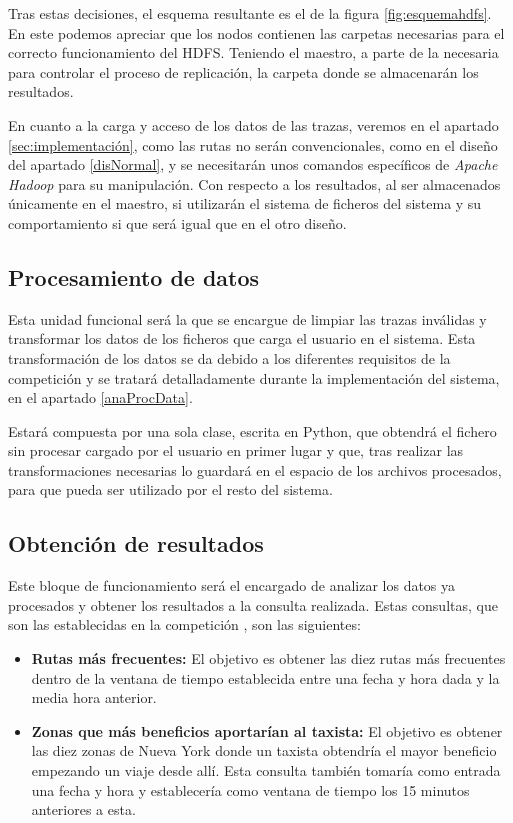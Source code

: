 Tras estas decisiones, el esquema resultante es el de la figura \ref{fig:esquemahdfs}. En este podemos apreciar que los nodos contienen las carpetas necesarias para el correcto funcionamiento del \gls{HDFS}. Teniendo el maestro, a parte de la necesaria para controlar el proceso de replicación, la carpeta donde se almacenarán los resultados.

En cuanto a la carga y acceso de los datos de las trazas, veremos en el apartado \ref{sec:implementación}, como las rutas no serán convencionales, como en el diseño del apartado \ref{disNormal}, y se necesitarán unos comandos específicos de \textit{Apache Hadoop} para su manipulación. Con respecto a los resultados, al ser almacenados únicamente en el maestro, si utilizarán el sistema de ficheros del sistema y su comportamiento si que será igual que en el otro diseño.

\subsection{Procesamiento de datos}
Esta unidad funcional será la que se encargue de limpiar las trazas inválidas y transformar los datos de los ficheros que carga el usuario en el sistema. Esta transformación de los datos se da debido a los diferentes requisitos de la competición y se tratará detalladamente durante la implementación del sistema, en el apartado \ref{anaProcData}.

Estará compuesta por una sola clase, escrita en Python, que obtendrá el fichero sin procesar cargado por el usuario en primer lugar y que, tras realizar las transformaciones necesarias lo guardará en el espacio de los archivos procesados, para que pueda ser utilizado por el resto del sistema.

\subsection{Obtención de resultados \label{disConsultas}}
Este bloque de funcionamiento será el encargado de analizar los datos ya procesados y obtener los resultados a la consulta realizada. Estas consultas, que son las establecidas en la competición \cite{grandChallenge}, son las siguientes:

\begin{itemize}
\item \textbf{Rutas más frecuentes:} El objetivo es obtener las diez rutas más frecuentes dentro de la ventana de tiempo establecida entre una fecha y hora dada y la media hora anterior.

\item \textbf{Zonas que más beneficios aportarían al taxista:} El objetivo es obtener las diez zonas de Nueva York donde un taxista obtendría el mayor beneficio empezando un viaje desde allí. Esta consulta también tomaría como entrada una fecha y hora y establecería como ventana de tiempo los 15 minutos anteriores a esta.
\end{itemize}

